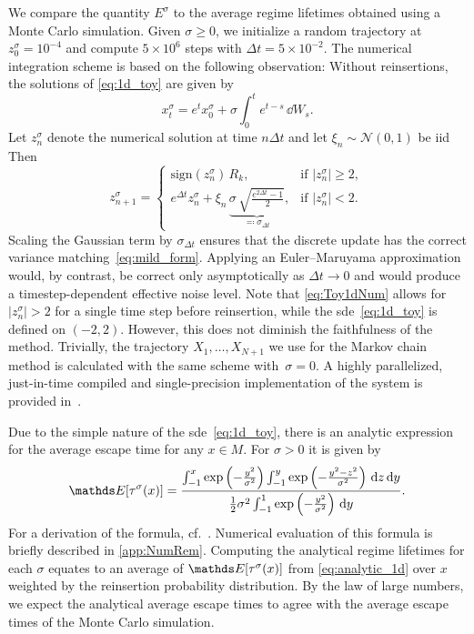 We compare the quantity $E^\sigma$ to the average regime lifetimes obtained using a Monte Carlo simulation. Given $\sigma \geq 0$, we initialize a random trajectory at $z_0^\sigma= 10^{-4}$ and compute $5\times 10^6$ steps with $\Delta t = 5\times 10^{-2}$. The numerical integration scheme is based on the following observation: Without reinsertions, the solutions of \cref{eq:1d_toy} are given by
\begin{equation}\label{eq:mild_form}
    x_t^\sigma = e^t x_0^\sigma + \sigma \int_0^t e^{t-s}\, \dd W_s.
\end{equation}
Let $z_n^\sigma$ denote the numerical solution at time $n\Delta t$ and let $\xi_n \sim \mathcal{N}(0,1)$ be \gls{iid} Then
\begin{equation}\label{eq:Toy1dNum}
    z_{n+1}^\sigma=
    \begin{cases}
        \mathrm{sign}(z_n^\sigma)\,R_{k},                                                                                     & \text{if }|z_n^\sigma|\ge 2, \\
        e^{\Delta t} z_n^\sigma + \xi_n\,\underbrace{\sigma\,\sqrt{\frac{e^{2\Delta t}-1}{2}}}_{\eqqcolon \sigma_{\Delta t}}, & \text{if }|z_n^\sigma|<2.
    \end{cases}
\end{equation}
Scaling the Gaussian term by $\sigma_{\Delta t}$ ensures that the discrete update has the correct variance matching~\cref{eq:mild_form}.  Applying an Euler--Maruyama approximation would, by contrast, be correct only asymptotically as $\Delta t \rightarrow 0$ and would produce a timestep-dependent effective noise level. Note that \cref{eq:Toy1dNum} allows for $|z_n^\sigma|>2$ for a single time step before reinsertion, while the \gls{sde}~\eqref{eq:1d_toy} is defined on $(-2, 2)$. However, this does not diminish the faithfulness of the method. Trivially, the trajectory $X_1, \hdots, X_{N+1}$ we use for the Markov chain method is calculated with the same scheme with~$\sigma=0$. A highly parallelized, just-in-time compiled and single-precision implementation of the system is provided in~\textcite{schoellerCodeNoiseinducedEnhancement2026}.

Due to the simple nature of the \gls{sde}~\eqref{eq:1d_toy}, there is an analytic expression for the average escape time for any $x\in M$. For $\sigma>0$ it is given by
\begin{equation}\label{eq:analytic_1d}
    \E[\tau^\sigma (x)] = \frac{\int_{-1}^x \exp\left(-\frac{y^2}{\sigma^2}\right) \int_{-1}^y \exp\left(-\frac{y^2 - z^2}{\sigma^2}\right) \, \mathrm{d}z\, \mathrm{d}y  }{\frac{1}{2}\sigma^2 \int_{-1}^1 \exp\left(-\frac{y^2}{\sigma^2}\right) \, \mathrm{d} y}.
\end{equation}
For a derivation of the formula, cf.~\textcite[eq.~(6.34)]{schussTheoryApplicationsStochastic2010}. Numerical evaluation of this formula is briefly described in \cref{app:NumRem}.
Computing the analytical regime lifetimes for each $\sigma$ equates to an average of $\E[\tau^\sigma (x)]$ from \cref{eq:analytic_1d} over $x$ weighted by the reinsertion probability distribution. By the law of large numbers, we expect the analytical average escape times to agree with the average escape times of the Monte Carlo simulation.

